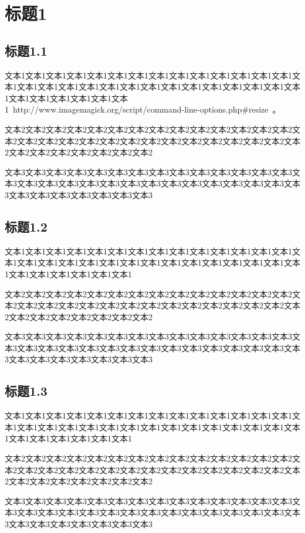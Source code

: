 \section{标题1}
\subsection{标题1.1}
文本1文本1文本1文本1文本1文本1文本1文本1文本1文本1文本1文本1文本1文本1文本1文本1文本1文本1文本1文本1文本1文本1文本1文本1文本1文本1文本1文本1文本1文本1文本1文本1文本1文本1文本1~http://www.imagemagick.org/script/command-line-options.php\#resize~。

文本2文本2文本2文本2文本2文本2文本2文本2文本2文本2文本2文本2文本2文本2文本2文本2文本2文本2文本2文本2文本2文本2文本2文本2文本2文本2文本2文本2文本2文本2文本2文本2文本2文本2文本2文本2

文本3文本3文本3文本3文本3文本3文本3文本3文本3文本3文本3文本3文本3文本3文本3文本3文本3文本3文本3文本3文本3文本3文本3文本3文本3文本3文本3文本3文本3文本3文本3文本3文本3文本3文本3文本3

\subsection{标题1.2}
文本1文本1文本1文本1文本1文本1文本1文本1文本1文本1文本1文本1文本1文本1文本1文本1文本1文本1文本1文本1文本1文本1文本1文本1文本1文本1文本1文本1文本1文本1文本1文本1文本1文本1文本1

文本2文本2文本2文本2文本2文本2文本2文本2文本2文本2文本2文本2文本2文本2文本2文本2文本2文本2文本2文本2文本2文本2文本2文本2文本2文本2文本2文本2文本2文本2文本2文本2文本2文本2文本2文本2

文本3文本3文本3文本3文本3文本3文本3文本3文本3文本3文本3文本3文本3文本3文本3文本3文本3文本3文本3文本3文本3文本3文本3文本3文本3文本3文本3文本3文本3文本3文本3文本3文本3文本3文本3文本3

\subsection{标题1.3}

文本1文本1文本1文本1文本1文本1文本1文本1文本1文本1文本1文本1文本1文本1文本1文本1文本1文本1文本1文本1文本1文本1文本1文本1文本1文本1文本1文本1文本1文本1文本1文本1文本1文本1文本1

文本2文本2文本2文本2文本2文本2文本2文本2文本2文本2文本2文本2文本2文本2文本2文本2文本2文本2文本2文本2文本2文本2文本2文本2文本2文本2文本2文本2文本2文本2文本2文本2文本2文本2文本2文本2

文本3文本3文本3文本3文本3文本3文本3文本3文本3文本3文本3文本3文本3文本3文本3文本3文本3文本3文本3文本3文本3文本3文本3文本3文本3文本3文本3文本3文本3文本3文本3文本3文本3文本3文本3文本3